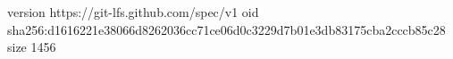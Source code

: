 version https://git-lfs.github.com/spec/v1
oid sha256:d1616221e38066d8262036cc71ce06d0c3229d7b01e3db83175cba2cccb85c28
size 1456

